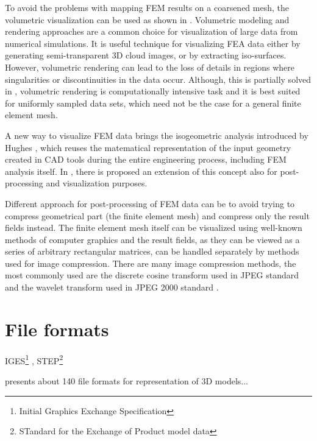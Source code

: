 To avoid the problems with mapping FEM results on a coarsened mesh, the volumetric visualization can be used as shown in \cite{Ueng2004}. Volumetric modeling and rendering approaches are a common choice for visualization of large data from numerical simulations. It is useful technique for visualizing FEA data either by generating semi-transparent 3D cloud images, or by extracting iso-surfaces. However, volumetric rendering can lead to the loss of details in regions where singularities or discontinuities in the data occur. Although, this is partially solved in \cite{Robaina2010}, volumetric rendering is computationally intensive task and it is best suited for uniformly sampled data sets, which need not be the case for a general finite element mesh.

A new way to visualize FEM data brings the isogeometric analysis introduced by Hughes \cite{Hughes2005}, which reuses the matematical representation of the input geometry created in CAD tools during the entire engineering process, including FEM analysis itself. In \cite{Stahl2017}, there is proposed an extension of this concept also for post-processing and visualization purposes.

Different approach for post-processing of FEM data can be to avoid trying to compress geometrical part (the finite element mesh) and compress only the result fields instead. The finite element mesh itself can be visualized using well-known methods of computer graphics and the result fields, as they can be viewed as a series of arbitrary rectangular matrices, can be handled separately by methods used for image compression. There are many image compression methods, the most commonly used are the discrete cosine transform \cite{Watson1994} used in JPEG standard and the wavelet transform used in JPEG 2000 standard \cite{Lui2001}.

\section{File formats}
IGES\footnote{Initial Graphics Exchange Specification} \cite{Groton2006}, STEP\footnote{STandard for the Exchange of Product model data} \cite{Pratt2001}



\cite{McHenry2008}  presents about 140 file formats for representation of 3D models...

